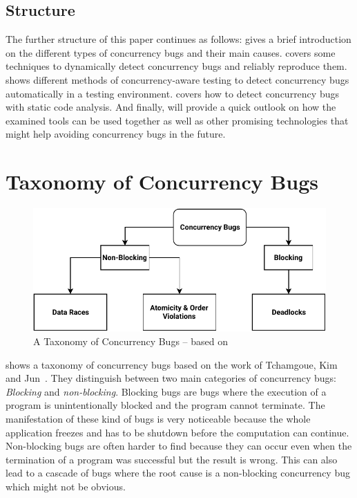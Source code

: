 \documentclass[conference]{IEEEtran}
\begin{document}
\subsection{Structure}

The further structure of this paper continues as follows:
 gives a brief introduction on the different types of concurrency bugs and their main causes.
 covers some techniques to dynamically detect concurrency bugs and reliably reproduce them.
 shows different methods of concurrency-aware testing to detect concurrency bugs automatically in a testing environment.
 covers how to detect concurrency bugs with static code analysis.
And finally,  will provide a quick outlook on how the examined tools can be used together as well as other promising technologies that might help avoiding concurrency bugs in the future.


\section{Taxonomy of Concurrency Bugs}
\label{sct:taxonomy}

\begin{figure}
    \includegraphics[width=\linewidth]{figures/ConcurrencyBugClasses.pdf}
    \caption{A Taxonomy of Concurrency Bugs -- based on\cite{tchamgoue2012testing}}
    \label{fig:classes}
\end{figure}

 shows a taxonomy of concurrency bugs based on the work of Tchamgoue, Kim and Jun~\cite{tchamgoue2012testing}.
They distinguish between two main categories of concurrency bugs: \emph{Blocking} and \emph{non-blocking}.
Blocking bugs are bugs where the execution of a program is unintentionally blocked and the program cannot terminate.
The manifestation of these kind of bugs is very noticeable because the whole application freezes and has to be shutdown before the computation can continue.
Non-blocking bugs are often harder to find because they can occur even when the termination of a program was successful but the result is wrong.
This can also lead to a cascade of bugs where the root cause is a non-blocking concurrency bug which might not be obvious.
\end{document}
